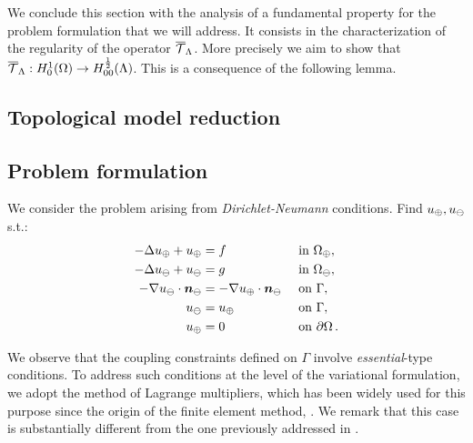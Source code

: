 \documentclass[r]{siamart171218}
\begin{document}
We conclude this section with the analysis of a fundamental property for the problem formulation that we will address.
It consists in the characterization of the regularity of the operator ${\overline{\mathcal{T}}_\Lambda}$.
More precisely we aim to show that ${\overline{\mathcal{T}}_\Lambda}: H^1_0(\Omega) \rightarrow H^\frac12_{00}(\Lambda)$.
This is a consequence of the following lemma.




\subsection{Topological model reduction}

\subsection{Problem formulation}
We consider the problem arising from \emph{Dirichlet-Neumann} conditions. Find $u_{\oplus},u_{\ominus}$ s.t.:
\begin{subequations}\label{eq:dirneu}
\begin{align}
\label{eq:dirneu1}
- \Delta \up  + \up &= f  && \text{ in } \Omega_{\oplus},\\
\label{eq:dirneu2}
- \Delta \uf  + \uf &= g  && \text{ in } \Omega_\ominus,\\
\label{eq:dirneu3}
-\nabla \uf \cdot \nn_{\ominus} &= -\nabla \up \cdot \nn_{\ominus}  && \text{ on } \Gamma,\\
\label{eq:dirneu4}
\uf &= \up && \text{ on }  \Gamma,\\
\label{eq:dirneu5}
\up &= 0 && \text{ on } \partial \Omega\,.
\end{align}
\end{subequations}

We observe that the coupling constraints defined on $\Gamma$ involve \emph{essential}-type conditions.
To address such conditions at the level of the variational formulation, we adopt the method of Lagrange multipliers,
which has been widely used for this purpose since the origin of the finite element method, \cite{MR359352}.
We remark that this case is substantially different from the one previously addressed in \cite{laurino_m2an}.
\end{document}
